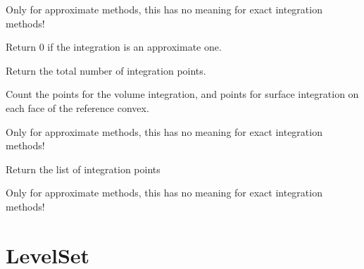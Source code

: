 \documentclass[a4paper,11pt,english]{sphinxmanual}
\begin{document}
\begin{fulllineitems}
\begin{fulllineitems}
Only for approximate methods, this has no meaning for exact
integration methods!

\end{fulllineitems}


\begin{fulllineitems}
\label{\detokenize{python/cmdref_Integ:getfem.Integ.is_exact}}
Return 0 if the integration is an approximate one.

\end{fulllineitems}


\begin{fulllineitems}
\label{\detokenize{python/cmdref_Integ:getfem.Integ.nbpts}}
Return the total number of integration points.

Count the points for the volume integration, and points for
surface integration on each face of the reference convex.

Only for approximate methods, this has no meaning for exact
integration methods!

\end{fulllineitems}


\begin{fulllineitems}
\label{\detokenize{python/cmdref_Integ:getfem.Integ.pts}}
Return the list of integration points

Only for approximate methods, this has no meaning for exact
integration methods!

\end{fulllineitems}


\end{fulllineitems}



\section{LevelSet}
\label{\detokenize{python/cmdref_LevelSet:levelset}}\label{\detokenize{python/cmdref_LevelSet::doc}}
\end{document}
